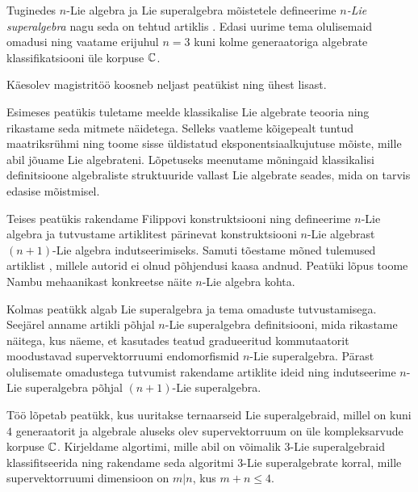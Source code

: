 Tuginedes $n$-Lie algebra ja Lie superalgebra mõistetele defineerime
\emph{$n$-Lie superalgebra} nagu seda on tehtud artiklis \cite{Abramov:2014}.
Edasi uurime tema olulisemaid omadusi ning vaatame erijuhul $n = 3$ kuni
kolme generaatoriga algebrate klassifikatsiooni üle korpuse $\mathbb{C}$.


Käesolev magistritöö koosneb neljast peatükist ning ühest lisast.

Esimeses peatükis tuletame meelde klassikalise Lie algebrate teooria ning
rikastame seda mitmete näidetega. Selleks vaatleme kõigepealt tuntud
maatriksrühmi ning toome sisse üldistatud eksponentsiaalkujutuse mõiste,
mille abil jõuame Lie algebrateni. Lõpetuseks meenutame mõningaid klassikalisi
definitsioone algebraliste struktuuride vallast Lie algebrate seades, mida
on tarvis edasise mõistmisel.

Teises peatükis rakendame Filippovi konstruktsiooni ning defineerime $n$-Lie
algebra ja tutvustame artiklitest \cite{AKMS:2014, AMS:2011}
pärinevat konstruktsiooni $n$-Lie algebrast $(n+1)$-Lie algebra indutseerimiseks.
Samuti tõestame mõned tulemused artiklist \cite{AKMS:2014}, millele autorid
ei olnud põhjendusi kaasa andnud. Peatüki lõpus toome Nambu mehaanikast
konkreetse näite $n$-Lie algebra kohta.

Kolmas peatükk algab Lie superalgebra ja tema omaduste tutvustamisega. Seejärel
anname artikli \cite{Abramov:2014} põhjal $n$-Lie superalgebra definitsiooni,
mida rikastame näitega, kus näeme, et kasutades teatud gradueeritud
kommutaatorit moodustavad supervektorruumi endomorfismid $n$-Lie superalgebra.
Pärast olulisemate omadustega tutvumist rakendame artiklite
\cite{Abramov:2014,AKMS:2014} ideid ning indutseerime $n$-Lie superalgebra
põhjal $(n+1)$-Lie superalgebra.

Töö lõpetab peatükk, kus uuritakse ternaarseid Lie superalgebraid, millel
on kuni $4$ generaatorit ja algebrale aluseks olev supervektorruum on
üle kompleksarvude korpuse $\mathbb{C}$. Kirjeldame algortimi, mille abil on võimalik
$3$-Lie superalgebraid klassifitseerida ning rakendame seda algoritmi
$3$-Lie superalgebrate korral, mille supervektorruumi dimensioon on $m|n$, kus
$m + n \leq 4$.

\bigskip

